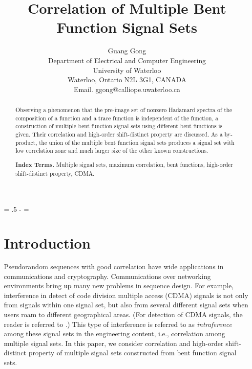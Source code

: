 \documentclass{article}
\newcommand{\ls}[1]
    {\dimen0=\fontdimen6\the\font\lineskip=#1\dimen0
     \advance\lineskip.5\fontdimen5\the\font
     \advance\lineskip-\dimen0
     \lineskiplimit=0.9\lineskip
     \baselineskip=\lineskip
     \advance\baselineskip\dimen0
     \normallineskip\lineskip\normallineskiplimit\lineskiplimit
     \normalbaselineskip\baselineskip
     \ignorespaces}
\begin{document}


\title{Correlation of Multiple Bent Function Signal Sets }
\author{Guang Gong\\
Department of Electrical and Computer Engineering \\
University of Waterloo \\
Waterloo, Ontario N2L 3G1, CANADA \\
Email. ggong@calliope.uwaterloo.ca\\
}

\date{}
 \maketitle

\thispagestyle{plain}
\setcounter{page}{1}

\begin{abstract}
Observing a  phenomenon that the pre-image set of nonzero Hadamard spectra of the  composition of a function and a trace function is independent of  the function,    a  construction of multiple bent function signal sets using different bent functions  is given.  Their correlation and    high-order shift-distinct property are discussed.    
As a by-product, the union of the multiple bent function signal sets produces a signal set with  low correlation zone and   much larger size of the other  known  constructions. 

{\bf Index Terms.}  Multiple signal sets, maximum correlation, bent functions, 
high-order shift-distinct property, CDMA.

\end{abstract}

\ls{1.5}
\section{Introduction}

Pseudorandom sequences with good correlation have  wide applications in communications and cryptography.  Communications over networking environments  bring up  many new problems  in sequence design.    For example, interference in detect of   code division multiple access (CDMA)
signals is not only   from signals within one signal set,
but also from several different signal sets when users 
 roam to different geographical areas. (For detection of CDMA signals, the reader is
 referred to \cite{Viterbi}\cite{Scholtz}\cite{Pursley}.) 
 This type of interference
is referred to as {\em intraference} among these signal sets in the engineering content,
i.e., correlation among multiple  signal sets.   In this paper, we consider correlation and  high-order shift-distinct property  of multiple signal sets constructed from bent function signal sets. 
\end{document}
